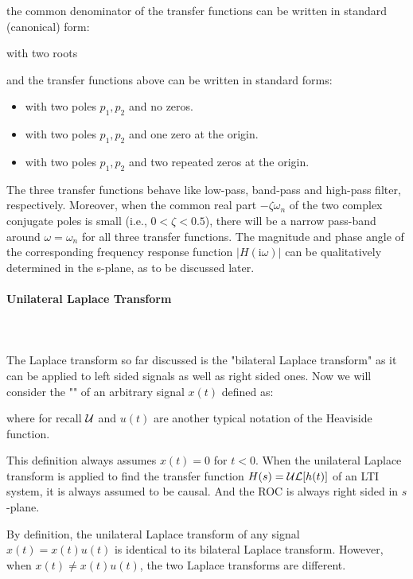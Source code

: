 	the common denominator of the transfer functions can be written in standard (canonical) form:
	
	with two roots
	
	and the transfer functions above can be written in standard forms:
	\begin{itemize}
		\item 
		
		with two poles $p_1, p_2$ and no zeros. 
		\item 
		
		with two poles $p_1, p_2$ and one zero at the origin. 
		\item 
		
		with two poles $p_1, p_2$ and two repeated zeros at the origin. 
	\end{itemize}
	The three transfer functions behave like low-pass, band-pass and high-pass filter, respectively. Moreover, when the common real part $-\zeta \omega_n$ of the two complex conjugate poles is small (i.e., $0<\zeta < 0.5$), there will be a narrow pass-band around $\omega=\omega_n$ for all three transfer functions. The magnitude and phase angle of the corresponding frequency response function $|H(\mathrm{i}\omega)|$ can be 
	qualitatively determined in the s-plane, as to be discussed later.
	
	\paragraph{Unilateral Laplace Transform}\mbox{}\\\\
	The Laplace transform so far discussed is the "bilateral Laplace transform" as it can be applied to left sided signals as well as right sided ones. Now we will consider the "" of an arbitrary signal $x(t)$ defined as:
	
	where for recall $\cal U$ and $u(t)$ are another typical notation of the Heaviside function.
	
	This definition always assumes $x(t)=0$ for $t<0$. When the unilateral Laplace transform is applied to find the transfer function $H(s)={\cal UL}[h(t)]$ of an LTI system, it is always assumed to be causal. And the ROC is always right sided in $s$-plane.
	
	By definition, the unilateral Laplace transform of any signal $x(t)=x(t)u(t)$ is identical to its bilateral Laplace transform. However, when $x(t) \ne x(t)u(t)$, the two Laplace transforms are different. 
	
